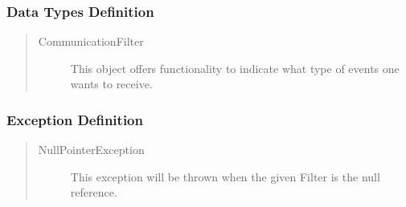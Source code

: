 \subsubsection{Data Types Definition}

\begin{quote}
	\begin{description}
		\item[CommunicationFilter] This object offers functionality to indicate what
		type of events one wants to receive.
	\end{description} 
\end{quote}

\subsubsection{Exception Definition} 

\begin{quote}
	\begin{description}
		\item[NullPointerException] This exception will be thrown when the given
		Filter is the null reference.
	\end{description} 
\end{quote}
